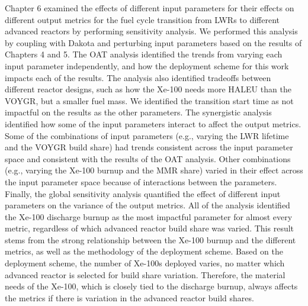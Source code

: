 Chapter 6 examined the effects of different input parameters for 
their effects on different output metrics for the fuel cycle transition from 
\glspl{LWR} to different advanced reactors by performing sensitivity 
analysis. We performed this analysis by coupling \Cyclus with Dakota 
and perturbing input parameters based on the results of Chapters 4 and 
5. The \acrfull{OAT} analysis identified the 
trends from varying each input parameter independently, and how the deployment 
scheme for this work impacts each of the results. The analysis also 
identified tradeoffs between different reactor designs, such as how the Xe-100 
needs more \gls{HALEU} than the VOYGR, but a smaller fuel mass. We identified 
the transition start time as not impactful on 
the results as the other parameters. The synergistic 
analysis identified how some of the input parameters interact to affect the output 
metrics. Some of the combinations of input parameters (e.g., varying 
the \gls{LWR} lifetime and the VOYGR build share) had trends consistent 
across the input parameter space and consistent with the results of 
the \gls{OAT} analysis. Other combinations (e.g., varying the Xe-100 
burnup and the \gls{MMR} share) varied in their effect across the input parameter 
space because of interactions between the parameters. Finally, the global 
sensitivity analysis quantified the effect of different input parameters 
on the variance of the output metrics. All of the analysis 
identified the Xe-100 discharge burnup as the most impactful parameter
for almost every metric, regardless of which advanced reactor build share 
was varied. This result stems from the strong relationship between 
the Xe-100 burnup and the different metrics, as well as the methodology 
of the deployment scheme. Based on the deployment scheme, the number of 
Xe-100s deployed varies, no matter which advanced reactor is selected for 
build share variation. Therefore, the material needs of the 
Xe-100, which is closely tied to the discharge burnup, always 
affects the metrics if there is variation in the advanced reactor 
build shares. 

